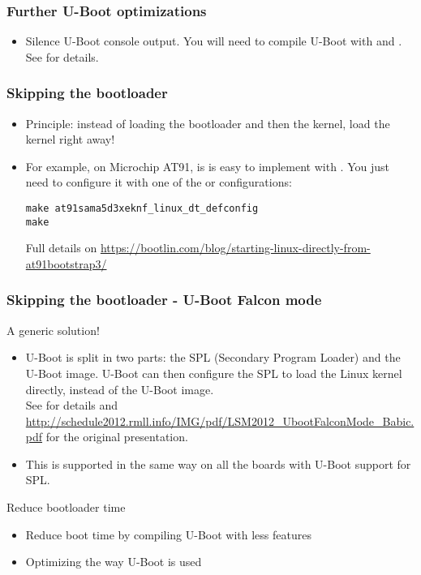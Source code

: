 \begin{frame}
\frametitle{Further U-Boot optimizations}
\begin{itemize}
\item Silence U-Boot console output. You will need to compile
      U-Boot with  and
      .\\
      See  for details.
\end{itemize}
\end{frame}

\begin{frame}[fragile]
\frametitle{Skipping the bootloader}
\begin{itemize}
\item Principle: instead of loading the bootloader and then the kernel,
      load the kernel right away!
\item For example, on Microchip AT91, is is easy to implement with
      . You just need to configure it
      with one of the  or  configurations:
\begin{block}{}
\begin{verbatim}
make at91sama5d3xeknf_linux_dt_defconfig
make
\end{verbatim}
\end{block}
      Full details on
      \url{https://bootlin.com/blog/starting-linux-directly-from-at91bootstrap3/}
\end{itemize}
\end{frame}

\begin{frame}[fragile]
\frametitle{Skipping the bootloader - U-Boot Falcon mode}
A generic solution!
\begin{itemize}
\item U-Boot is split in two parts: the SPL (Secondary Program Loader)
      and the U-Boot image. U-Boot can then configure the SPL to load
      the Linux kernel directly, instead of the U-Boot image.\\
      See  for details and
      \url{http://schedule2012.rmll.info/IMG/pdf/LSM2012_UbootFalconMode_Babic.pdf}
      for the original presentation.
\item This is supported in the same way on all the boards with U-Boot
support for SPL.
\end{itemize}
\end{frame}

\setuplabframe
{Reduce bootloader time}
{
\begin{itemize}
\item Reduce boot time by compiling U-Boot with less features
\item Optimizing the way U-Boot is used
\end{itemize}
}


